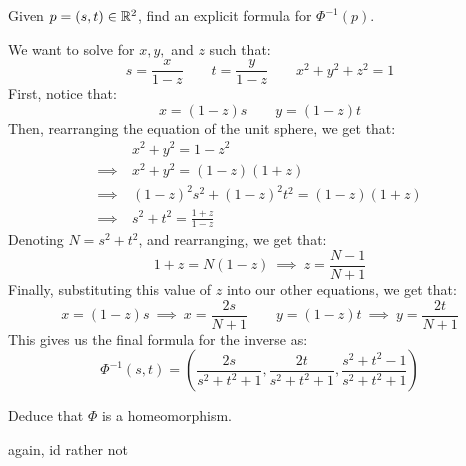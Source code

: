 \documentclass{article}
\begin{document}
\begin{qu}
    Given $ p = (s, t) \in \mathbb{R}^{2} $, find an explicit formula for $ \Phi^{-1}(p) $.
\end{qu}

\begin{soln}
    We want to solve for $ x, y, $ and $ z $ such that:
    \begin{equation*}
        s = \frac{x}{1-z} \qquad t = \frac{y}{1-z} \qquad x^{2} + y^{2} + z^{2} = 1
    \end{equation*}
    First, notice that:
    \begin{equation*}
        x = (1-z)s \qquad y = (1-z)t
    \end{equation*}
    Then, rearranging the equation of the unit sphere, we get that:
    \begin{align*}
        & x^{2} + y^{2} = 1 - z^{2} \\
        \implies \ & x^{2} + y^{2} = (1-z)(1+z) \\
        \implies \ & (1-z)^{2}s^{2} + (1-z)^{2}t^{2} = (1-z)(1+z) \\
        \implies \ & s^{2} + t^{2} = \frac{1+z}{1-z}
    \end{align*}
    Denoting $ N = s^{2} + t^{2} $, and rearranging, we get that:
    \begin{equation*}
        1 + z = N(1 - z) \ \implies \ z = \frac{N - 1}{N + 1}
    \end{equation*}
    Finally, substituting this value of $ z $ into our other equations, we get that:
    \begin{equation*}
        x = (1 - z)s \ \implies \ x = \frac{2s}{N + 1} \qquad
        y = (1 - z)t \ \implies \ y = \frac{2t}{N + 1}
    \end{equation*}
    This gives us the final formula for the inverse as:
    \begin{equation*}
        \Phi^{-1}(s, t) = \left( \frac{2s}{s^{2} + t^{2} + 1},
        \frac{2t}{s^{2} + t^{2} + 1}, \frac{s^{2} + t^{2} - 1}{s^{2} + t^{2} + 1}\right)
    \end{equation*}
\end{soln}

\begin{qu}
    Deduce that $ \Phi $ is a homeomorphism.
\end{qu}

\begin{soln}
    again, id rather not
\end{soln}
\end{document}
